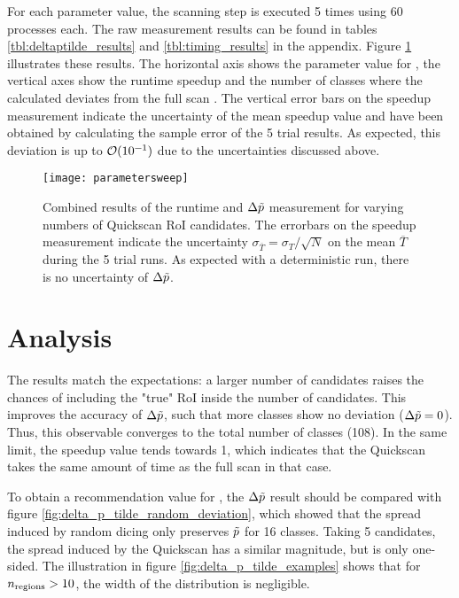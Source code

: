 For each parameter value, the scanning step is executed \num{5} times using \num{60} processes each. The raw measurement results can be found in tables \ref{tbl:deltaptilde_results} and \ref{tbl:timing_results} in the appendix. Figure \ref{fig:parametersweep} illustrates these results. The horizontal axis shows the parameter value for \paramregions, the vertical axes show the runtime speedup and the number of classes where the calculated \ptilde deviates from the full scan \ptilde. The vertical error bars on the speedup measurement indicate the uncertainty of the mean speedup value and have been obtained by calculating the sample error of the \num{5} trial results. As expected, this deviation is up to $\order{\num{e-1}}$ due to the uncertainties discussed above.

\begin{figure}[htbp]
	\centering
	\texttt{[image: parametersweep]}
	\caption{Combined results of the runtime and $\Delta \tilde{p}$ measurement for varying numbers of Quickscan RoI candidates. The errorbars on the speedup measurement indicate the uncertainty $\sigma_{\overline T} = \sigma_T / \sqrt{N}$ on the mean $\overline T$ during the \num{5} trial runs. As expected with a deterministic run, there is no uncertainty of $\Delta \tilde{p}$.}
	\label{fig:parametersweep}
\end{figure}

\section{Analysis}
The results match the expectations: a larger number of candidates raises the chances of including the "true" RoI inside the number of candidates. This improves the accuracy of $\Delta \tilde{p}$, such that more classes show no deviation ($\Delta \tilde{p} = \num{0}$). Thus, this observable converges to the total number of classes (\num{108}). In the same limit, the speedup value tends towards \num{1}, which indicates that the Quickscan takes the same amount of time as the full scan in that case.

To obtain a recommendation value for \paramregions, the $\Delta \tilde{p}$ result should be compared with figure \ref{fig:delta_p_tilde_random_deviation}, which showed that the spread induced by random dicing only preserves $\tilde{p}$ for \num{16} classes. Taking \num{5} candidates, the spread induced by the Quickscan has a similar magnitude, but is only one-sided.
The illustration in figure \ref{fig:delta_p_tilde_examples} shows that for ${n_\mathrm{regions}} > \num{10}$, the width of the distribution is negligible. 

